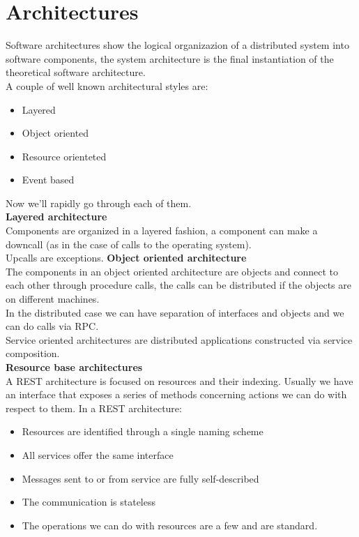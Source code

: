 \section{Architectures}
Software architectures show the logical organizazion of a distributed system into software components, the system architecture is the final instantiation of the theoretical software architecture. \\
A couple of well known architectural styles are:
\begin{itemize}
    \item Layered
    \item Object oriented
    \item Resource orienteted
    \item Event based
\end{itemize}
Now we'll rapidly go through each of them. \\
\textbf{Layered architecture} \\
Components are organized in a layered fashion, a component can make a downcall (as in the case of calls to the operating system). \\
Upcalls are exceptions.
\smallSpace
\textbf{Object oriented architecture} \\
The components in an object oriented architecture are objects and connect to each other through procedure calls, the calls can be distributed if the objects are on different machines. \\
In the distributed case we can have separation of interfaces and objects and we can do calls via RPC. \\
Service oriented architectures are distributed applications constructed via service composition. \\
\smallSpace
\textbf{Resource base architectures} \\
A REST architecture is focused on resources and their indexing. Usually we have an interface that exposes a series of methods concerning actions we can do with respect to them. In a REST architecture:
\begin{itemize}
    \item Resources are identified through a single naming scheme
    \item All services offer the same interface
    \item Messages sent to or from service are fully self-described
    \item The communication is stateless
    \item The operations we can do with resources are a few and are standard.
\end{itemize}
